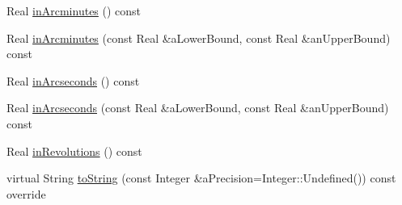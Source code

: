\begin{DoxyCompactItemize}
\item 
Real \hyperlink{classlibrary_1_1physics_1_1units_1_1_angle_a10195e20b7540e0813c3b2a13c8bf453}{in\+Arcminutes} () const
\item 
Real \hyperlink{classlibrary_1_1physics_1_1units_1_1_angle_a2d16e08281a9745f0da118b56999f313}{in\+Arcminutes} (const Real \&a\+Lower\+Bound, const Real \&an\+Upper\+Bound) const
\item 
Real \hyperlink{classlibrary_1_1physics_1_1units_1_1_angle_af4f0f122d7136c92505a9ec65835815b}{in\+Arcseconds} () const
\item 
Real \hyperlink{classlibrary_1_1physics_1_1units_1_1_angle_acc904a64f693fa07bac55f28c39ba8b4}{in\+Arcseconds} (const Real \&a\+Lower\+Bound, const Real \&an\+Upper\+Bound) const
\item 
Real \hyperlink{classlibrary_1_1physics_1_1units_1_1_angle_a19611fa8ef42050c6ff9724034544d4f}{in\+Revolutions} () const
\item 
virtual String \hyperlink{classlibrary_1_1physics_1_1units_1_1_angle_aae6b7bd4e028ea7719f5a712ca19a86c}{to\+String} (const Integer \&a\+Precision=Integer\+::\+Undefined()) const override
\end{DoxyCompactItemize}
